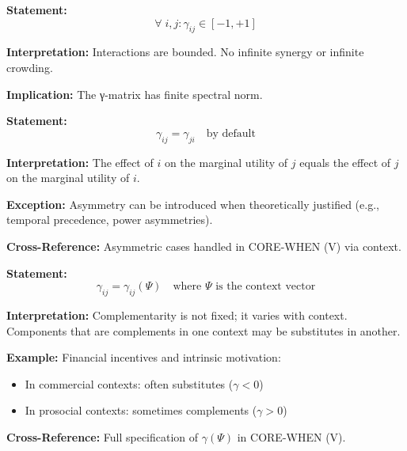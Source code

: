 \begin{tcolorbox}[colback=gray!5!white, colframe=gray!75!black,
    title=Axiom UNMAPPED_CMP-2: Boundedness]
\textbf{Statement:}
\begin{equation}
\forall \; i, j: \gamma_{ij} \in [-1, +1]
\end{equation}

\textbf{Interpretation:} Interactions are bounded. No infinite synergy or infinite crowding.

\textbf{Implication:} The γ-matrix has finite spectral norm.
\end{tcolorbox}

\begin{tcolorbox}[colback=gray!5!white, colframe=gray!75!black,
    title=Axiom UNMAPPED_CMP-3: Default Symmetry]
\textbf{Statement:}
\begin{equation}
\gamma_{ij} = \gamma_{ji} \quad \text{by default}
\end{equation}

\textbf{Interpretation:} The effect of $i$ on the marginal utility of $j$ equals
the effect of $j$ on the marginal utility of $i$.

\textbf{Exception:} Asymmetry can be introduced when theoretically justified
(e.g., temporal precedence, power asymmetries).

\textbf{Cross-Reference:} Asymmetric cases handled in CORE-WHEN (V) via context.
\end{tcolorbox}

\begin{tcolorbox}[colback=gray!5!white, colframe=gray!75!black,
    title=Axiom UNMAPPED_CMP-4: Context Dependence]
\textbf{Statement:}
\begin{equation}
\gamma_{ij} = \gamma_{ij}(\Psi) \quad \text{where } \Psi \text{ is the context vector}
\end{equation}

\textbf{Interpretation:} Complementarity is not fixed; it varies with context.
Components that are complements in one context may be substitutes in another.

\textbf{Example:} Financial incentives and intrinsic motivation:
\begin{itemize}
\item In commercial contexts: often substitutes ($\gamma < 0$)
\item In prosocial contexts: sometimes complements ($\gamma > 0$)
\end{itemize}

\textbf{Cross-Reference:} Full specification of $\gamma(\Psi)$ in CORE-WHEN (V).
\end{tcolorbox}

